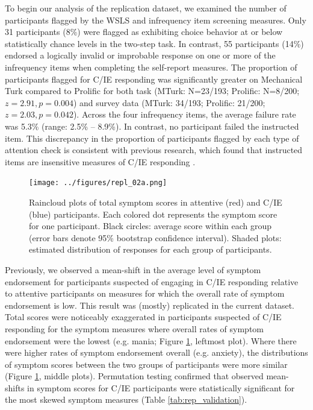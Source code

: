 \documentclass[a4paper,notitlepage,12pt]{article}
\begin{document}
\begin{refsection}[supp]
To begin our analysis of the replication dataset, we examined the number of participants flagged by the WSLS and infrequency item screening measures. Only 31 participants (8\%) were flagged as exhibiting choice behavior at or below statistically chance levels in the two-step task. In contrast, 55 participants (14\%) endorsed a logically invalid or improbable response on one or more of the infrequency items when completing the self-report measures. The proportion of participants flagged for C/IE responding was significantly greater on Mechanical Turk compared to Prolific for both task (MTurk: N=23/193; Prolific: N=8/200; $z=2.91, p=0.004$) and survey data (MTurk: 34/193; Prolific: 21/200; $z = 2.03, p = 0.042$). Across the four infrequency items, the average failure rate was 5.3\% (range: 2.5\% -- 8.9\%). In contrast, no participant failed the instructed item. This discrepancy in the proportion of participants flagged by each type of attention check is consistent with previous research, which found that instructed items are insensitive measures of C/IE responding \cite{barends2019noncompliant-2, thomas2017validity-2, hauser2016attentive-2}.   

\begin{figure}[t!]
\texttt{[image: ../figures/repl\_02a.png]}
\centering
\captionsetup{width=0.88\textwidth}
\caption{Raincloud plots of total symptom scores in attentive (red) and C/IE (blue) participants. Each colored dot represents the symptom score for one participant. Black circles: average score within each group (error bars denote 95\% bootstrap confidence interval). Shaded plots: estimated distribution of responses for each group of participants.}
\label{fig:repl_distributions}
\end{figure}

Previously, we observed a mean-shift in the average level of symptom endorsement for participants suspected of engaging in C/IE responding relative to attentive participants on measures for which the overall rate of symptom endorsement is low. This result was (mostly) replicated in the current dataset. Total scores were noticeably exaggerated in participants suspected of C/IE responding for the symptom measures where overall rates of symptom endorsement were the lowest (e.g. mania; Figure \ref{fig:repl_distributions}, leftmost plot). Where there were higher rates of symptom endorsement overall (e.g. anxiety), the distributions of symptom scores between the two groups of participants were more similar (Figure \ref{fig:repl_distributions}, middle plots). Permutation testing confirmed that observed mean-shifts in symptom scores for C/IE participants were statistically significant for the most skewed symptom measures (Table \ref{tab:rep_validation}).


\end{refsection}
\end{document}
